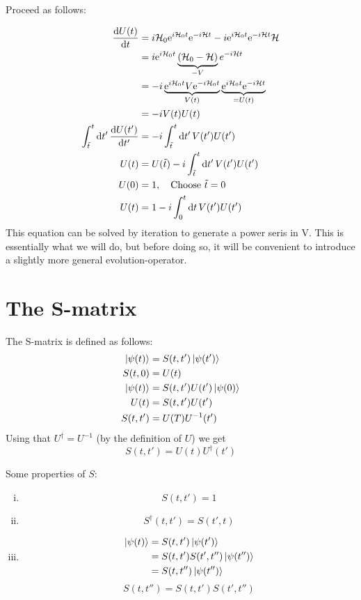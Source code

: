  Proceed as follows: 
 
 \begin{align*} 
 \dv{U(t)}{t} &=  i\mathcal{H}_0\mathrm{e}^{i\mathcal{H}_0 t}\mathrm{e}^{-i\mathcal{H} t}- i\mathrm{e}^{i\mathcal{H}_0 t}\mathrm{e}^{-i\mathcal{H} t}\mathcal{H} \\
 &= i \mathrm{e}^{i\mathcal{H}_0 t}\underbrace{\left( \mathcal{H}_0 - \mathcal{H} \right)}_{-V}e^{-i\mathcal{H} t} \\
 &= -i \underbrace{\mathrm{e}^{i\mathcal{H}_0 t}V\mathrm{e}^{-i\mathcal{H}_0 t}}_{V(t)}\underbrace{\mathrm{e}^{i\mathcal{H}_0 t}\mathrm{e}^{-i\mathcal{H} t}}_{=U(t)} \\
 &= -iV(t)U(t) \\
 \int_{\tilde{t}}^{t}\dd{t'} \dv{U(t')}{t'} &= -i\int_{\tilde{t}}^{t}\dd{t'}V(t')U(t') \\
 U(t) &= U(\tilde{t}) -i \int_{\tilde{t}}^{t}\dd{t'}V(t')U(t') \\
 U(0) &= 1, \quad \text{Choose } \tilde{t} =0 \\
 U(t) &= 1 -i\int_0^t\dd{t}V(t')U(t')
 \end{align*}
 This equation can be solved by iteration to generate a power seris in V. This is essentially what we will do, but before doing so, it will be convenient to introduce a slightly more general evolution-operator.
 
\section{The S-matrix}

The S-matrix is defined as follows:
\begingroup
\addtolength{\jot}{1em}
\begin{align*}
\ket{\psi(t)} &= S(t, t')\ket{\psi(t')} \\
S(t,0) &= U(t)\\
\ket{\psi(t)} &= S(t, t')U(t')\ket{\psi(0)} \\
U(t) &= S(t, t')U(t') \\
S(t, t') &= U(T)U^{-1}(t')
\end{align*}
\endgroup
Using that $U^\dagger = U^{-1}$ (by the definition of $U$) we get
\begin{equation} 
S(t, t') = U(t)U^\dagger (t')
\end{equation}

Some properties of $S$:
\begin{enumerate}[i)]
	\item \[S(t, t') = 1\]
	\item \begin{equation}\label{eq:S_prop} 
	S^\dagger(t, t') = S(t', t)
	\end{equation}
	\item \begin{align*} 
	\ket{\psi(t)} &= S(t, t')\ket{\psi(t')} \\
	&=  S(t, t')S(t', t'')\ket{\psi(t'')} \\
	&=  S(t, t'')\ket{\psi(t'')}
	\end{align*}
	\begin{equation} 
	\label{eq:S_matrix}
	S(t, t'') = S(t, t')S(t', t'')
	\end{equation}
\end{enumerate}

